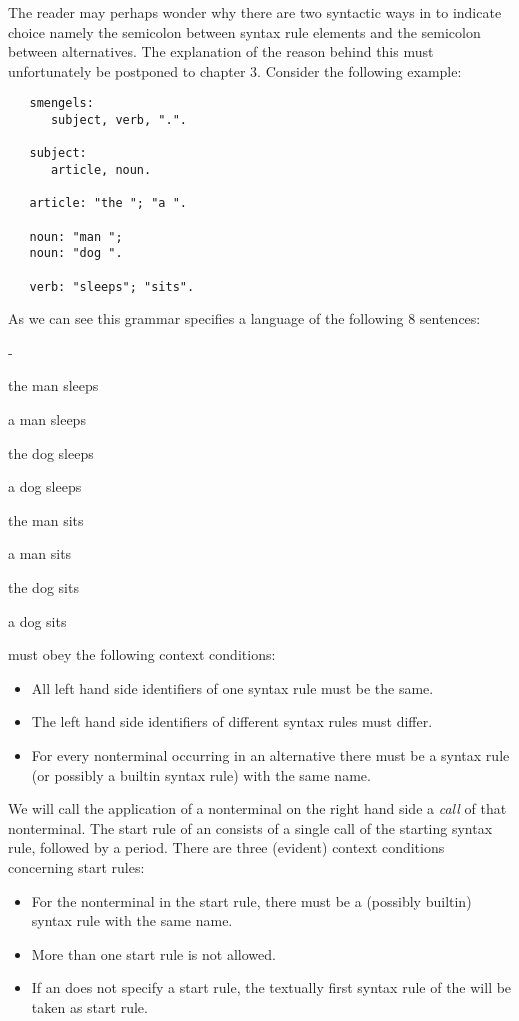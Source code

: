 The reader may perhaps wonder why there are two syntactic ways in
\EAG to indicate choice namely the semicolon between syntax rule
elements and the semicolon between alternatives. The explanation
of the reason behind this must unfortunately be postponed to chapter 3.
Consider the following example:
\begin{verbatim}
   smengels:
      subject, verb, ".".

   subject:
      article, noun.

   article: "the "; "a ".

   noun: "man ";
   noun: "dog ".

   verb: "sleeps"; "sits".
\end{verbatim}
As we can see this grammar specifies a language of the following 8
sentences:
\begin {list}{-}{\setlength {\itemsep}{0ex} \setlength {\parsep}{0ex}}
\item the man sleeps
\item a man sleeps
\item the dog sleeps
\item a dog sleeps
\item the man sits
\item a man sits
\item the dog sits
\item a dog sits
\end {list}
\EAGs must obey the following context conditions:
\begin {itemize}
\item
All left hand side identifiers of one syntax rule must be the same.
\item
The left hand side identifiers of different syntax rules must differ.
\item
For every nonterminal occurring in an alternative there must be
a syntax rule (or possibly a builtin syntax rule) with the same name.
\end {itemize}
We will call the application of a nonterminal on the right hand side a
{\em call} of that nonterminal. The start rule of an \EAG consists of
a single call of the starting syntax rule, followed by a period.
There are three (evident) context conditions concerning start rules:
\begin {itemize}
\item
For the nonterminal in the start rule, there must be a (possibly builtin)
syntax rule with the same name.
\item
More than one start rule is not allowed.
\item
If an \EAG does not specify a start rule, the textually first
syntax rule of the \EAG will be taken as start rule.
\end {itemize}
